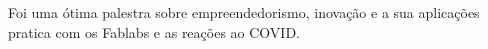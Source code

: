 \myemptypage{}
\rhead{\thechapter}


Foi uma ótima palestra sobre empreendedorismo, inovação e a sua aplicações pratica com os Fablabs e as reações ao COVID.